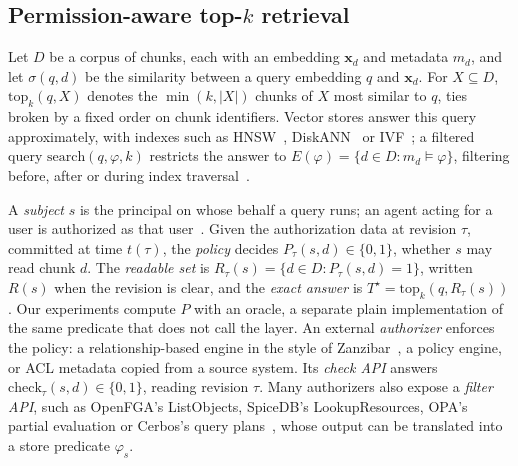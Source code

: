 
\subsection{\texorpdfstring{Permission-aware top-$k$ retrieval}{Permission-aware top-k retrieval}}\label{sec:prob-setup}

Let $D$ be a corpus of chunks, each with an embedding $\mathbf{x}_d$ and metadata $m_d$, and let
$\sigma(q,d)$ be the similarity between a query embedding $q$ and $\mathbf{x}_d$. For $X \subseteq D$,
$\mathrm{top}_k(q,X)$ denotes the $\min(k,|X|)$ chunks of $X$ most similar to $q$, ties broken by a fixed
order on chunk identifiers. Vector stores answer this query approximately, with indexes such as
HNSW~\cite{malkov2020efficient}, DiskANN~\cite{subramanya2019diskann} or IVF~\cite{douze2024faiss}; a filtered
query $\mathrm{search}(q,\varphi,k)$ restricts the answer to $E(\varphi) = \{d \in D : m_d \models \varphi\}$,
filtering before, after or during index traversal~\cite{patel2024acorn,chronis2025filtered}.

A \emph{subject} $s$ is the principal on whose behalf a query runs; an agent acting for a user is
authorized as that user~\cite{jones2020oauth}. Given the authorization data at revision $\tau$, committed at
time $t(\tau)$, the \emph{policy} decides $P_\tau(s,d) \in \{0,1\}$, whether $s$ may read chunk $d$. The
\emph{readable set} is $R_\tau(s) = \{d \in D : P_\tau(s,d) = 1\}$, written $R(s)$ when the revision is clear,
and the \emph{exact answer} is $T^\star = \mathrm{top}_k(q, R_\tau(s))$. Our experiments compute $P$ with an
oracle, a separate plain implementation of the same predicate that does not call the layer. An external \emph{authorizer} enforces the policy: a
relationship-based engine in the style of Zanzibar~\cite{pang2019zanzibar}, a policy engine, or ACL metadata
copied from a source system. Its \emph{check API} answers $\mathrm{check}_\tau(s,d) \in \{0,1\}$, reading
revision $\tau$. Many authorizers also expose a \emph{filter API}, such as OpenFGA's ListObjects, SpiceDB's
LookupResources, OPA's partial evaluation or Cerbos's query
plans~\cite{openfga2026perform,authzed2026protecting,opa2026evaluating,cerbos2026cerbos}, whose output can be
translated into a store predicate $\varphi_s$.

